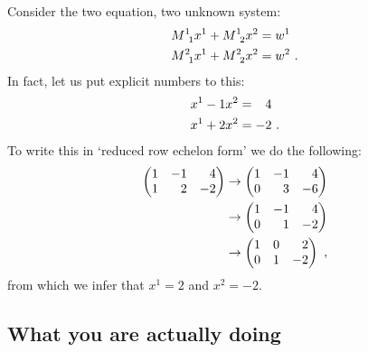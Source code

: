 \documentclass[12pt, oneside]{report}    %
\begin{document}
\begin{example}\label{eg:rref:2d}
Consider the two equation, two unknown system:
\begin{align}
    M\aij{1}{1} x^1 + M\aij{1}{2}x^2 &= w^1\\
    M\aij{2}{1} x^1 + M\aij{2}{2}x^2 &= w^2 \ .
\end{align}
In fact, let us put explicit numbers to this:
\begin{align}
    x^1 - 1 x^2 &=  \pp 4 \\
    x^1 + 2x^2 &= -2 \ .
\end{align}
To write this in `reduced row echelon form' we do the following:
\begin{align}
    \begin{pmatrix}
        1 & -1 & \pp 4 \\
        1 & \pp 2 & -2
    \end{pmatrix}
    &\to 
    \begin{pmatrix}
        1 & -1 & \pp 4 \\
        0 & \pp 3 & -6
    \end{pmatrix}
    \\
    &\to 
    \begin{pmatrix}
        1 & -1 & \pp 4 \\
        0 & \pp 1 & -2
    \end{pmatrix}
    \\
    &\to 
    \begin{pmatrix}
        1 & 0 & \pp 2 \\
        0 &  1 & -2
    \end{pmatrix} \ ,
\end{align}
from which we infer that $x^1 = 2$ and $x^2 = -2$. 
\end{example}

\subsection{What you are actually doing}
\end{document}
